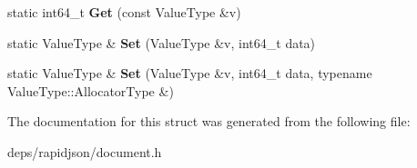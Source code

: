 \begin{DoxyCompactItemize}
\item 
static int64\+\_\+t {\bfseries Get} (const Value\+Type \&v)\hypertarget{structinternal_1_1_type_helper_3_01_value_type_00_01int64__t_01_4_abe3368c8817cafe420a8b3f7d6ec1759}{}\label{structinternal_1_1_type_helper_3_01_value_type_00_01int64__t_01_4_abe3368c8817cafe420a8b3f7d6ec1759}

\item 
static Value\+Type \& {\bfseries Set} (Value\+Type \&v, int64\+\_\+t data)\hypertarget{structinternal_1_1_type_helper_3_01_value_type_00_01int64__t_01_4_a0c7b71569c12346902a396111782b12b}{}\label{structinternal_1_1_type_helper_3_01_value_type_00_01int64__t_01_4_a0c7b71569c12346902a396111782b12b}

\item 
static Value\+Type \& {\bfseries Set} (Value\+Type \&v, int64\+\_\+t data, typename Value\+Type\+::\+Allocator\+Type \&)\hypertarget{structinternal_1_1_type_helper_3_01_value_type_00_01int64__t_01_4_a85471fa774b4a8f4f56c191694a7f278}{}\label{structinternal_1_1_type_helper_3_01_value_type_00_01int64__t_01_4_a85471fa774b4a8f4f56c191694a7f278}

\end{DoxyCompactItemize}


The documentation for this struct was generated from the following file\+:\begin{DoxyCompactItemize}
\item 
deps/rapidjson/document.\+h\end{DoxyCompactItemize}
